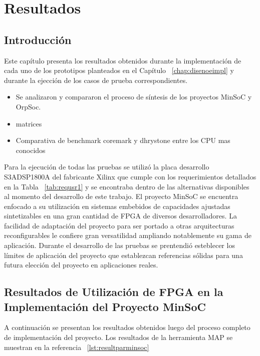 \chapter{Resultados}
	\section{Introducción} 
	
	Este capítulo presenta los resultados obtenidos durante la implementación de cada uno de los prototipos planteados en el Capítulo
	~\ref{chap:disenoeimpl} y durante la ejección de los casos de prueba correspondientes. 
	\begin{itemize}
				  	\item Se analizaron y compararon el proceso de síntesis de los proyectos MinSoC y OrpSoc. 
					\item matrices
					\item Comparativa de benchmark coremark y dhrystone entre los CPU mas conocidos					
				\end{itemize}				
				
	Para la ejecución de todas las pruebas se utilizó la placa desarrollo S3ADSP1800A del fabricante Xilinx que cumple con los requerimientos detallados
	en la Tabla ~\ref{tab:requsr1} y se encontraba dentro de las alternativas disponibles al momento del desarrollo de este trabajo.
El proyecto MinSoC se encuentra enfocado a su utilización en sistemas embebidos de capacidades ajustadas sintetizables en una gran cantidad de FPGA
	de diversos desarrolladores. La facilidad de adaptación del proyecto para ser portado a otras arquitecturas reconfigurables le confiere gran
	versatilidad ampliando notablemente su gama de aplicación.
	Durante el desarrollo de las pruebas se prentendió esteblecer los límites de aplicación del proyecto que establezcan referencias sólidas para una
	futura elección del proyecto en aplicaciones reales.

	\newpage
	\section{Resultados de Utilización de FPGA en la Implementación del Proyecto MinSoC}

	A continuación se presentan los resultados obtenidos luego del proceso completo de implementación del proyecto.  Los resultados de la herramienta
	MAP se muestran en la referencia ~\ref{lst:resultparminsoc}

